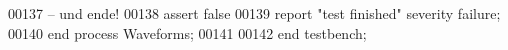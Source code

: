 \begin{DoxyCode}
00137 \textcolor{keyword}{            -- und ende!}
00138             \textcolor{keywordflow}{assert} \textcolor{vhdlchar}{false}
00139             \textcolor{keywordflow}{report} \textcolor{keyword}{"test finished"} \textcolor{keywordflow}{severity} \textcolor{vhdlchar}{failure};
00140         \textcolor{keywordflow}{end} \textcolor{keywordflow}{process} \textcolor{vhdlchar}{Waveforms};
00141 
00142 \textcolor{keywordflow}{end} \textcolor{vhdlchar}{testbench};
\end{DoxyCode}
